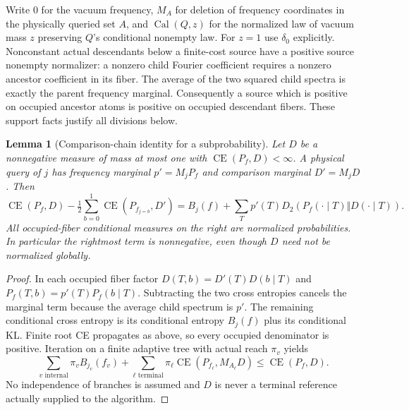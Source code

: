 \documentclass[11pt]{article}
\newtheorem{lemma}{Lemma}
\newcommand{\KL}{D_2}
\newcommand{\CE}{\operatorname{CE}}
\begin{document}
Write $0$ for the vacuum frequency, $M_A$ for deletion of frequency
coordinates in the physically queried set $A$, and $\operatorname{Cal}(Q,z)$
for the normalized law of vacuum mass $z$ preserving $Q$'s conditional
nonempty law. For $z=1$ use $\delta_0$ explicitly. Nonconstant actual
descendants below a finite-cost source have a positive source nonempty
normalizer: a nonzero child Fourier coefficient requires a nonzero
ancestor coefficient in its fiber. The average of the two squared child
spectra is exactly the parent frequency marginal. Consequently a source
which is positive on occupied ancestor atoms is positive on occupied
descendant fibers. These support facts justify all divisions below.

\begin{lemma}[Comparison-chain identity for a subprobability]
\label{lem:subprob8}
Let $D$ be a nonnegative measure of mass at most one with
$\CE(P_f,D)<\infty$. A physical query of $j$ has frequency marginal
$p'=M_jP_f$ and comparison marginal $D'=M_jD$. Then
\[
\CE(P_f,D)-\tfrac12\sum_{b=0}^1\CE(P_{f_{j=b}},D')
=B_j(f)+\sum_Tp'(T)\KL(P_f(\cdot\mid T)\Vert D(\cdot\mid T)).
\]
All occupied-fiber conditional measures on the right are normalized
probabilities. In particular the rightmost term is nonnegative, even
though $D$ need not be normalized globally.
\end{lemma}
\begin{proof}
In each occupied fiber factor $D(T,b)=D'(T)D(b\mid T)$ and
$P_f(T,b)=p'(T)P_f(b\mid T)$. Subtracting the two cross entropies cancels
the marginal term because the average child spectrum is $p'$.
The remaining conditional cross entropy is its conditional entropy
$B_j(f)$ plus its conditional KL. Finite root CE propagates as above,
so every occupied denominator is positive. Iteration on a finite
adaptive tree with actual reach $\pi_v$ yields
\[
\sum_{v\text{ internal}}\pi_v B_{j_v}(f_v)
+\sum_{\ell\text{ terminal}}\pi_\ell\CE(P_{f_\ell},M_{A_\ell}D)
\le\CE(P_f,D).
\]
No independence of branches is assumed and $D$ is never a terminal
reference actually supplied to the algorithm.
\end{proof}
\end{document}
